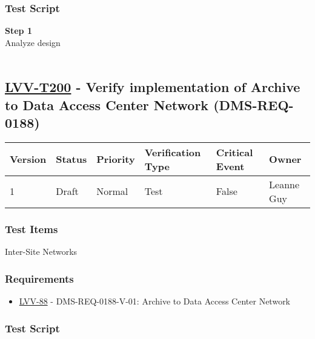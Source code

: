\hypertarget{test-script-176}{%
\subsubsection{Test Script}\label{test-script-176}}

\textbf{Step 1}\\
Analyze design\\
~\\

\hypertarget{lvv-t200---verify-implementation-of-archive-to-data-access-center-network-dms-req-0188}{%
\subsection{\texorpdfstring{\href{https://jira.lsstcorp.org/secure/Tests.jspa\#/testCase/LVV-T200}{LVV-T200}
- Verify implementation of Archive to Data Access Center Network
(DMS-REQ-0188)}{LVV-T200 - Verify implementation of Archive to Data Access Center Network (DMS-REQ-0188)}}\label{lvv-t200---verify-implementation-of-archive-to-data-access-center-network-dms-req-0188}}

\begin{longtable}[]{@{}llllll@{}}
\toprule
Version & Status & Priority & Verification Type & Critical Event &
Owner\tabularnewline
\midrule
\endhead
1 & Draft & Normal & Test & False & Leanne Guy\tabularnewline
\bottomrule
\end{longtable}

\hypertarget{test-items-176}{%
\subsubsection{Test Items}\label{test-items-176}}

Inter-Site Networks~

\hypertarget{requirements-177}{%
\subsubsection{Requirements}\label{requirements-177}}

\begin{itemize}
\tightlist
\item
  \href{https://jira.lsstcorp.org/browse/LVV-88}{LVV-88} -
  DMS-REQ-0188-V-01: Archive to Data Access Center Network
\end{itemize}

\hypertarget{test-script-177}{%
\subsubsection{Test Script}\label{test-script-177}}

